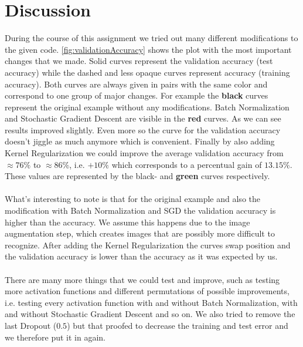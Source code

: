 \documentclass{article}
\begin{document}
	
	\section{Discussion}
	\label{sec:Discussion}
	During the course of this assignment we tried out many different modifications to the given code. \autoref{fig:validationAccuracy} shows the plot with the most important changes that we made. Solid curves represent the validation accuracy (test accuracy) while the dashed and less opaque curves represent accuracy (training accuracy). Both curves are always given in pairs with the same color and correspond to one group of major changes. For example the \textbf{black} curves represent the original example without any modifications. Batch Normalization and Stochastic Gradient Descent are visible in the \textbf{red} curves. As we can see results improved slightly. Even more so the curve for the validation accuracy doesn't jiggle as much anymore which is convenient. Finally by also adding Kernel Regularization we could improve the average validation accuracy from $\approx76\%$ to $\approx86\%$, i.e. $+10\%$ which corresponds to a percentual gain of $13.15\%$. These values are represented by the black- and \textbf{green} curves respectively. \\
	\\
	What's interesting to note is that for the original example and also the modification with Batch Normalization and SGD the validation accuracy is higher than the accuracy. We assume this happens due to the image augmentation step, which creates images that are possibly more difficult to recognize. After adding the Kernel Regularization the curves swap position and the validation accuracy is lower than the accuracy as it was expected by us. \\
	\\
	There are many more things that we could test and improve, such as testing more activation functions and different permutations of possible improvements, i.e. testing every activation function with and without Batch Normalization, with and without Stochastic Gradient Descent and so on. We also tried to remove the last Dropout ($0.5$) but that proofed to decrease the training and test error and we therefore put it in again. 
\end{document}
